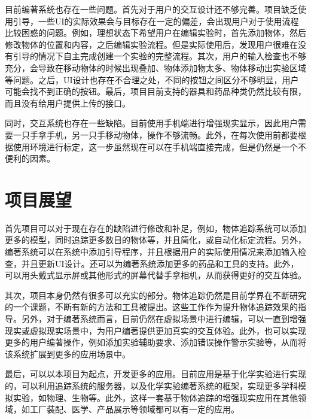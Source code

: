 目前编著系统也存在一些问题。首先对于用户的交互设计还不够完善。项目缺乏使用引导，一些UI的实际效果会与目标存在一定的偏差，会出现用户对于使用流程比较困惑的问题。例如，理想状态下希望用户在编辑实验时，首先添加物体，然后修改物体的位置和内容，之后编辑实验流程。但是实际使用后，发现用户很难在没有引导的情况下自主完成创建一个实验的完整流程。其次，用户的输入检查也不够充分，会导致在移动物体的时候出现叠加、物体添加物太多、物体移动出实验区域等问题。之后，UI设计也存在不合理之处，不同的按钮之间区分不够明显，用户可能会找不到正确的按钮。最后，项目目前支持的器具和药品种类仍然比较有限，而且没有给用户提供上传的接口。

同时，交互系统也存在一些缺陷。目前使用手机端进行增强现实显示，因此用户需要一只手拿手机，另一只手移动物体，操作不够流畅。此外，在每次使用前都要根据使用环境进行标定，这一步虽然现在可以在手机端直接完成，但是仍然是一个不便利的因素。

\section{项目展望}
首先项目可以对于现在存在的缺陷进行修改和补足，例如，物体追踪系统可以添加更多的模型，同时追踪更多数目的物体等，并且简化，或自动化标定流程。另外，编著系统可以在系统中添加引导程序，并且根据用户的实际使用情况来添加输入检查，并且更新UI设计。还可以为编著系统添加更多的药品和工具的支持。此外，可以用头戴式显示屏或其他形式的屏幕代替手拿相机，从而获得更好的交互体验。

其次，项目本身仍然有很多可以充实的部分。物体追踪仍然是目前学界在不断研究的一个课题，不断有新的方法和工具被提出。这些工作作为提升物体追踪效果的指导。另外，对于编著系统而言，目前仍然在虚拟场景中进行编辑，可以一直到增强现实或虚拟现实场景中，为用户编著提供更加真实的交互体验。此外，也可以实现更多的用户编著操作，例如添加实验辅助要求、添加错误操作警示实验等，从而将该系统扩展到更多的应用场景中。

最后，可以以本项目为起点，开发更多的应用。目前应用是基于化学实验进行实现的，可以利用追踪系统的服务器，以及化学实验编著系统的框架，实现更多学科模拟实验，如物理、生物等。此外，这样一套基于物体追踪的增强现实应用在其他领域，如工厂装配、医学、产品展示等领域都可以有一定的应用。